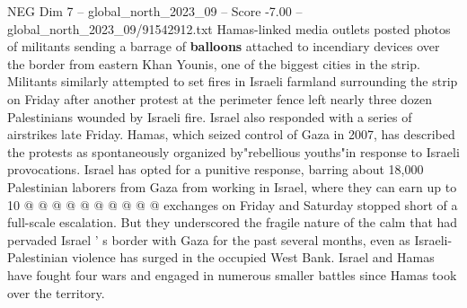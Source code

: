 \begin{textsample}{NEG Dim 7 – global\_north\_2023\_09 – Score -7.00 – global\_north\_2023\_09/91542912.txt}
Hamas-linked media outlets posted photos of militants sending a barrage of \textbf{balloons} attached to incendiary devices over the border from eastern Khan Younis, one of the biggest cities in the strip.
Militants similarly attempted to set fires in Israeli farmland surrounding the strip on Friday after another protest at the perimeter fence left nearly three dozen Palestinians wounded by Israeli fire.
Israel also responded with a series of airstrikes late Friday.
Hamas, which seized control of Gaza in 2007, has described the protests as spontaneously organized by"rebellious youths"in response to Israeli provocations.
Israel has opted for a punitive response, barring about 18,000 Palestinian laborers from Gaza from working in Israel, where they can earn up to 10 @ @ @ @ @ @ @ @ @ @ exchanges on Friday and Saturday stopped short of a full-scale escalation.
But they underscored the fragile nature of the calm that had pervaded Israel ' s border with Gaza for the past several months, even as Israeli-Palestinian violence has surged in the occupied West Bank.
Israel and Hamas have fought four wars and engaged in numerous smaller battles since Hamas took over the territory.

\end{textsample}
